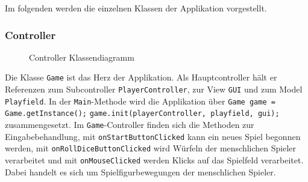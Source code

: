 \documentclass[conference]{IEEEtran}
\begin{document}
  Im folgenden werden die einzelnen Klassen der Applikation vorgestellt.\\

\subsubsection{Controller}
\begin{figure}[]
    \centering
    \caption{Controller Klassendiagramm}
\end{figure}

Die Klasse \texttt{Game} ist das Herz der Applikation. Als Hauptcontroller h\"alt er Referenzen zum Subcontroller \texttt{PlayerController}, zur View \texttt{GUI} und zum Model \texttt{Playfield}. In der \texttt{Main}-Methode wird die Applikation \"uber\newline
\texttt{Game game = Game.getInstance();}\newline
\texttt{game.init(playerController, playfield, gui);}\newline
zusammengesetzt. Im \texttt{Game}-Controller finden sich die Methoden zur Eingabebehandlung, mit \texttt{onStartButtonClicked} kann ein neues Spiel begonnen werden, mit \texttt{onRollDiceButtonClicked} wird W\"urfeln der menschlichen Spieler verarbeitet und mit \texttt{onMouseClicked} werden Klicks auf das Spielfeld verarbeitet. Dabei handelt es sich um Spielfigurbewegungen der menschlichen Spieler.
\end{document}
